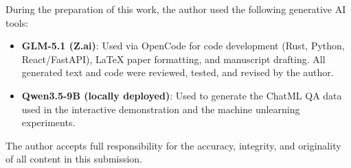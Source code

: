 \documentclass[sigconf]{acmart}
\begin{document}
During the preparation of this work, the author used the following generative AI tools:

\begin{itemize}
	\item \textbf{GLM-5.1 (Z.ai)}: Used via OpenCode for code development (Rust, Python, React/FastAPI), LaTeX paper formatting, and manuscript drafting. All generated text and code were reviewed, tested, and revised by the author.
	\item \textbf{Qwen3.5-9B (locally deployed)}: Used to generate the ChatML QA data used in the interactive demonstration and the machine unlearning experiments.
\end{itemize}

The author accepts full responsibility for the accuracy, integrity, and originality of all content in this submission.


\balance

\end{document}

